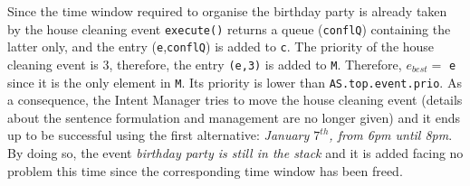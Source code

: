 				Since the time window required to organise the birthday party is already taken by the house cleaning event \texttt{execute()} returns a queue (\texttt{conflQ}) containing the latter only, and the entry (\texttt{e},\texttt{conflQ}) is added to \texttt{c}. The priority of the house cleaning event is 3, therefore, the entry \texttt{(e,3)} is added to \texttt{M}. Therefore, $e_{best} =$ \texttt{e} since it is the only element in \texttt{M}. Its priority is lower than \texttt{AS.top.event.prio}. As a consequence, the Intent Manager tries to move the house cleaning event (details about the sentence formulation and management are no longer given) and it ends up to be successful using the first alternative: \textit{January $7^{th}$, from 6pm until 8pm}. By doing so, the event \textit{birthday party is still in the stack} and it is added facing no problem this time since the corresponding time window has been freed.

